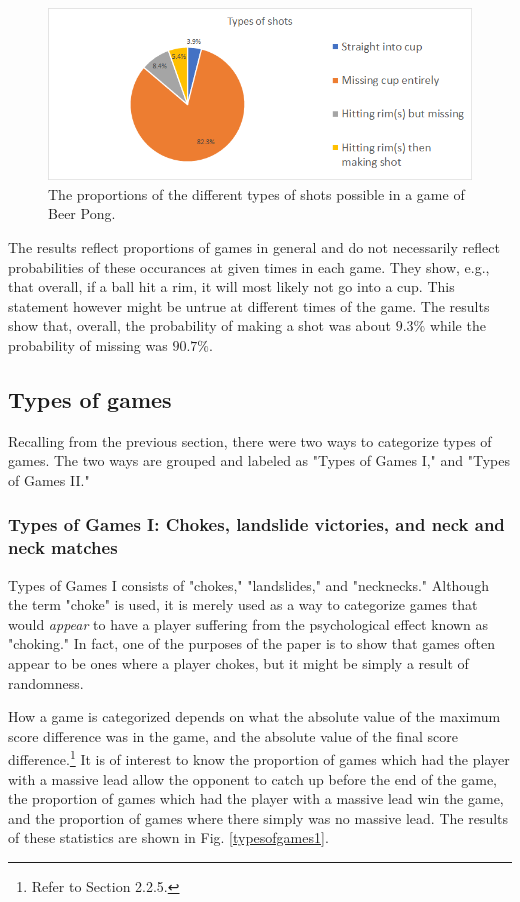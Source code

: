 \documentclass{article}
\begin{document}
\begin{figure}
	\centering
	\includegraphics[width=0.7\linewidth]{typesofshots}
	\caption{The proportions of the different types of shots possible in a game of Beer Pong.}
	\label{typesofshots}
\end{figure}

The results reflect proportions of games in general and do not necessarily reflect probabilities of these occurances at given times in each game. They show, e.g., that overall, if a ball hit a rim, it will most likely not go into a cup. This statement however might be untrue at different times of the game. The results show that, overall, the probability of making a shot was about $9.3\%$ while the probability of missing was $90.7\%$.

\subsection{Types of games}
Recalling from the previous section, there were two ways to categorize types of games. The two ways are grouped and labeled as "Types of Games I," and "Types of Games II." 
\subsubsection{Types of Games I: Chokes, landslide victories, and neck and neck matches}
Types of Games I consists of "chokes," "landslides," and "necknecks." Although the term "choke" is used, it is merely used as a way to categorize games that would \textit{appear} to have a player suffering from the psychological effect known as "choking." In fact, one of the purposes of the paper is to show that games often appear to be ones where a player chokes, but it might be simply a result of randomness. 

How a game is categorized depends on what the absolute value of the maximum score difference was in the game, and the absolute value of the final score difference.\footnote{Refer to Section 2.2.5.} It is of interest to know the proportion of games which had the player with a massive lead allow the opponent to catch up before the end of the game, the proportion of games which had the player with a massive lead win the game, and the proportion of games where there simply was no massive lead. The results of these statistics are shown in Fig. \ref{typesofgames1}.
\end{document}
